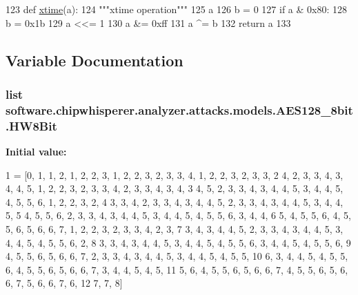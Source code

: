 \begin{DoxyCode}
123 \textcolor{keyword}{def }\hyperlink{namespacesoftware_1_1chipwhisperer_1_1analyzer_1_1attacks_1_1models_1_1AES128__8bit_ad37a36500fd9ae3d9248e1146f9f8fa5}{xtime}(a):
124     \textcolor{stringliteral}{"""xtime operation"""}
125     a %
126     b = 0
127     \textcolor{keywordflow}{if} a & 0x80:
128         b = 0x1b
129     a <<= 1
130     a &= 0xff
131     a ^= b
132     \textcolor{keywordflow}{return} a
133 \end{DoxyCode}


\subsection{Variable Documentation}
\hypertarget{namespacesoftware_1_1chipwhisperer_1_1analyzer_1_1attacks_1_1models_1_1AES128__8bit_a2c5c921d3b44ad512e0cc55be1f4b301}{}
\subsubsection[{H\+W8\+Bit}]{\setlength{\rightskip}{0pt plus 5cm}list software.\+chipwhisperer.\+analyzer.\+attacks.\+models.\+A\+E\+S128\+\_\+8bit.\+H\+W8\+Bit}\label{namespacesoftware_1_1chipwhisperer_1_1analyzer_1_1attacks_1_1models_1_1AES128__8bit_a2c5c921d3b44ad512e0cc55be1f4b301}
{\bfseries Initial value\+:}
\begin{DoxyCode}
1 = [0, 1, 1, 2, 1, 2, 2, 3, 1, 2, 2, 3, 2, 3, 3, 4, 1, 2, 2, 3, 2, 3, 3,
2           4, 2, 3, 3, 4, 3, 4, 4, 5, 1, 2, 2, 3, 2, 3, 3, 4, 2, 3, 3, 4, 3, 4,
3           4, 5, 2, 3, 3, 4, 3, 4, 4, 5, 3, 4, 4, 5, 4, 5, 5, 6, 1, 2, 2, 3, 2,
4           3, 3, 4, 2, 3, 3, 4, 3, 4, 4, 5, 2, 3, 3, 4, 3, 4, 4, 5, 3, 4, 4, 5,
5           4, 5, 5, 6, 2, 3, 3, 4, 3, 4, 4, 5, 3, 4, 4, 5, 4, 5, 5, 6, 3, 4, 4,
6           5, 4, 5, 5, 6, 4, 5, 5, 6, 5, 6, 6, 7, 1, 2, 2, 3, 2, 3, 3, 4, 2, 3,
7           3, 4, 3, 4, 4, 5, 2, 3, 3, 4, 3, 4, 4, 5, 3, 4, 4, 5, 4, 5, 5, 6, 2,
8           3, 3, 4, 3, 4, 4, 5, 3, 4, 4, 5, 4, 5, 5, 6, 3, 4, 4, 5, 4, 5, 5, 6,
9           4, 5, 5, 6, 5, 6, 6, 7, 2, 3, 3, 4, 3, 4, 4, 5, 3, 4, 4, 5, 4, 5, 5,
10           6, 3, 4, 4, 5, 4, 5, 5, 6, 4, 5, 5, 6, 5, 6, 6, 7, 3, 4, 4, 5, 4, 5,
11           5, 6, 4, 5, 5, 6, 5, 6, 6, 7, 4, 5, 5, 6, 5, 6, 6, 7, 5, 6, 6, 7, 6,
12           7, 7, 8]
\end{DoxyCode}


